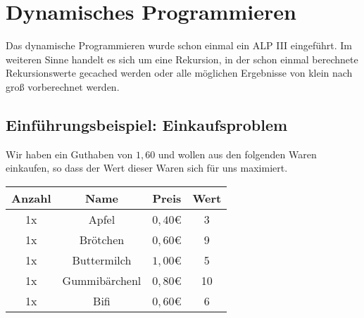 \section{Dynamisches Programmieren}

Das dynamische Programmieren wurde schon einmal ein ALP III eingeführt. Im weiteren Sinne handelt es sich um eine Rekursion, in der schon einmal berechnete Rekursionswerte gecached werden oder alle möglichen Ergebnisse von klein nach groß vorberechnet werden.

\subsection{Einführungsbeispiel: Einkaufsproblem}

Wir haben ein Guthaben von $1,60$ und wollen aus den folgenden Waren einkaufen, so dass der Wert dieser Waren sich für uns maximiert.\\

\begin{tabular}{cccc}
Anzahl & Name & Preis & Wert\\
\hline
1x & Apfel & $0,40$\euro{} & 3\\
1x & Brötchen & $0,60$\euro{} & 9\\
1x & Buttermilch & $1,00$\euro{} & 5\\
1x & Gummibärchenl & $0,80$\euro{} & 10\\
1x & Bifi & $0,60$\euro{} & 6\\
\end{tabular}